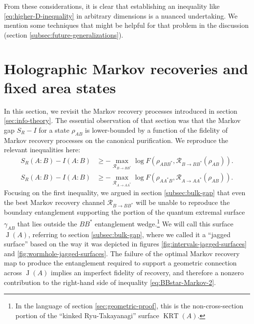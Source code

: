 \documentclass[a4paper,11pt]{article}
\newcommand{\KRT}{\operatorname{KRT}}
\newcommand{\J}{\operatorname{J}}
\begin{document}
From these considerations, it is clear that establishing an inequality like \eqref{eq:higher-D-inequality} in arbitrary dimensions is a nuanced undertaking. We mention some techniques that might be helpful for that problem in the discussion (section \ref{subsec:future-generalizations}).

\section{Holographic Markov recoveries and fixed area states}
\label{sec:recovery-models}

In this section, we revisit the Markov recovery processes introduced in section \ref{sec:info-theory}. The essential observation of that section was that the Markov gap $S_R - I$ for a state $\rho_{AB}$ is lower-bounded by a function of the fidelity of Markov recovery processes on the canonical purification. We reproduce the relevant inequalities here:
\begin{align}
    S_R(A:B) - I(A:B) \label{eq:BBstar-Markov-2}
        & \geq - \max_{\mathcal{R}_{B \rightarrow B B^*}} \log F(\rho_{A B B^*}, \mathcal{R}_{B \rightarrow B B^*}(\rho_{AB})). \\
    S_R(A:B) - I(A:B) \label{eq:AAstar-Markov-2}
        & \geq - \max_{\mathcal{R}_{A \rightarrow A A^*}} \log F(\rho_{A A^* B}, \mathcal{R}_{A \rightarrow A A^*}(\rho_{AB})).
\end{align}
Focusing on the first inequality, we argued in section \ref{subsec:bulk-gap} that even the best Markov recovery channel $\mathcal{R}_{B \rightarrow BB^*}$ will be unable to reproduce the boundary entanglement supporting the portion of the quantum extremal surface $\gamma_{AB}$ that lies outside the $B B^*$ entanglement wedge.\footnote{In the language of section \ref{sec:geometric-proof}, this is the non-cross-section portion of the ``kinked Ryu-Takayanagi'' surface $\KRT(A).$} We will call this surface $\J(A)$, referring to section \ref{subsec:bulk-gap}, where we called it a ``jagged surface'' based on the way it was depicted in figures \ref{fig:intervals-jagged-surfaces} and \ref{fig:wormhole-jagged-surfaces}. The failure of the optimal Markov recovery map to produce the entanglement required to support a geometric connection across $\J(A)$ implies an imperfect fidelity of recovery, and therefore a nonzero contribution to the right-hand side of inequality \eqref{eq:BBstar-Markov-2}.
\end{document}
